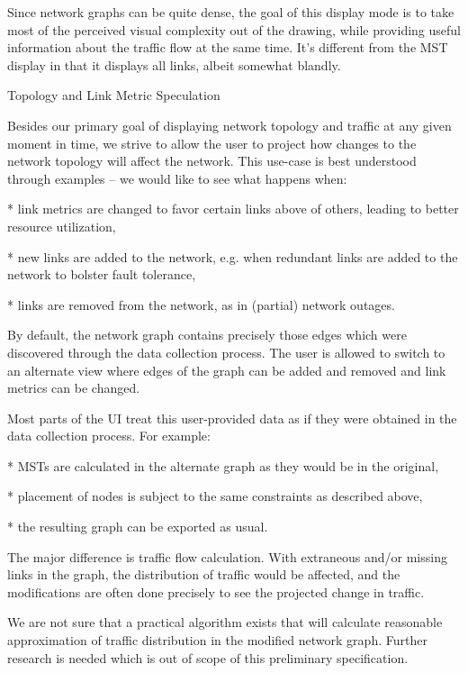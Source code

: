 Since network graphs can be quite dense, the goal of this display mode is to
take most of the perceived visual complexity out of the drawing, while
providing useful information about the traffic flow at the same time. It's
different from the MST display in that it displays all links, albeit somewhat
blandly.

\secc Topology and Link Metric Speculation

Besides our primary goal of displaying network topology and traffic at any
given moment in time, we strive to allow the user to project how changes to the
network topology will affect the network. This use-case is best understood
through examples -- we would like to see what happens when:

\begitems

* link metrics are changed to favor certain links above of others, leading to
better resource utilization,

* new links are added to the network, e.g. when redundant links are added to the
network to bolster fault tolerance,

* links are removed from the network, as in (partial) network outages.

\enditems

By default, the network graph contains precisely those edges which were
discovered through the data collection process. The user is allowed to switch to
an alternate view where edges of the graph can be added and removed and link
metrics can be changed.

Most parts of the UI treat this user-provided data as if they were obtained in
the data collection process. For example:

\begitems

* MSTs are calculated in the alternate graph as they would be in the original,

* placement of nodes is subject to the same constraints as described above,

* the resulting graph can be exported as usual.

\enditems

The major difference is traffic flow calculation. With extraneous and/or
missing links in the graph, the distribution of traffic would be affected, and
the modifications are often done precisely to see the projected change in
traffic.

We are not sure that a practical algorithm exists that will calculate reasonable
approximation of traffic distribution in the modified network graph. Further
research is needed which is out of scope of this preliminary specification.

